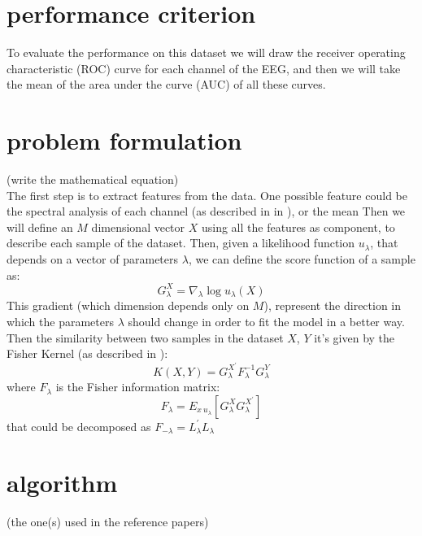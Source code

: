 \documentclass[final,leqno,onefignum,onetabnum]{siamltexmm}
\begin{document}
\section{performance criterion}
To evaluate the performance on this dataset we will draw the receiver operating characteristic (ROC) curve for each channel of the EEG, and then we will take the mean of the area under the curve (AUC) of all these curves. 


\section{problem formulation}
(write the mathematical equation)\\
The first step is to extract features from the data. One possible feature could be the spectral analysis of each channel (as described in in \cite{features1}), or the mean  Then we will define an $M$ dimensional vector $X$ using all the features as component, to describe each sample of the dataset. Then, given a likelihood function $u_\lambda$, that depends on  a vector of parameters $\lambda$, we can define the score function of a sample as:
\begin{equation}\label{Glambda}
G_\lambda^X=\nabla_{\lambda }\log u_\lambda(X)  
\end{equation}
This gradient (which dimension depends only on $M$), represent the direction in which the parameters $\lambda$ should change in order to fit the model in a better way.
Then the similarity between two samples in the dataset $X$, $Y$ it's given by the Fisher Kernel (as described in \cite{fisher}):
\begin{equation}
K(X,Y)=G_\lambda^{X^{'}}F_\lambda^{-1} G_\lambda^Y
\end{equation} 
where $F_\lambda$ is the Fisher information matrix:
\begin{equation}
F_\lambda=E_{x~u_\lambda}[ G_\lambda^XG_\lambda^{X^{'}}]
\end{equation} 
that could be decomposed as $F_{-\lambda}=L_\lambda^{'}L_\lambda$








\section{algorithm}
 (the one(s) used in the reference papers)
\end{document}
